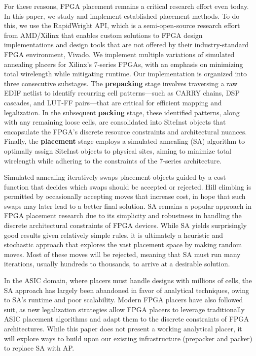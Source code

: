 \documentclass{article}
\begin{document}
\begin{multicols}{2}
    For these reasons, FPGA placement remains a critical research effort even today. 
    In this paper, we study and implement established placement methods. 
    To do this, we use the RapidWright API, which is a semi-open-source research effort from AMD/Xilinx that enables custom solutions to FPGA design implementations and design tools that are not offered by their industry-standard FPGA environment, Vivado. 
    We implement multiple variations of simulated annealing placers for Xilinx's 7-series FPGAs, with an emphasis on minimizing total wirelength while mitigating runtime. 
    Our implementation is organized into three consecutive substages. 
    The \textbf{prepacking} stage involves traversing a raw EDIF netlist to identify recurring cell patterns—such as CARRY chains, DSP cascades, and LUT-FF pairs—that are critical for efficient mapping and legalization. 
    In the subsequent \textbf{packing} stage, these identified patterns, along with any remaining loose cells, are consolidated into SiteInst objects that encapsulate the FPGA’s discrete resource constraints and architectural nuances. 
    Finally, the \textbf{placement} stage employs a simulated annealing (SA) algorithm to optimally assign SiteInst objects to physical sites, aiming to minimize total wirelength while adhering to the constraints of the 7-series architecture. 

    Simulated annealing iteratively swaps placement objects guided by a cost function that decides which swaps should be accepted or rejected. 
    Hill climbing is permitted by occasionally accepting moves that increase cost, in hope that such swaps may later lead to a better final solution. 
    SA remains a popular approach in FPGA placement research due to its simplicity and robustness in handling the discrete architectural constraints of FPGA devices. 
    While SA yields surprisingly good results given relatively simple rules, it is ultimately a heuristic and stochastic approach that explores the vast placement space by making random moves. 
    Most of these moves will be rejected, meaning that SA must run many iterations, usually hundreds to thousands, to arrive at a desirable solution. 

    In the ASIC domain, where placers must handle designs with millions of cells, the SA approach has largely been abandoned in favor of analytical techniques, owing to SA's runtime and poor scalability. 
    Modern FPGA placers have also followed suit, as new legalization strategies allow FPGA placers to leverage traditionally ASIC placement algorithms and adapt them to the discrete constraints of FPGA architectures. 
    While this paper does not present a working analytical placer, it will explore ways to build upon our existing infrastructure (prepacker and packer) to replace SA with AP. 


\end{multicols}
\end{document}
